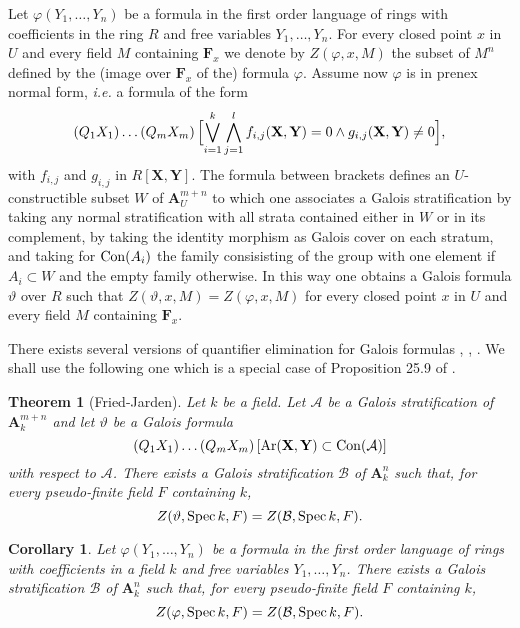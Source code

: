 \documentclass[english,12pt]{amsart}
\def\AA{{\mathbf A}}
\def\FF{{\mathbf F}}
\def\XX{{\mathbf X}}
\def\YY{{\mathbf Y}}
\def\cA{{\mathcal A}}
\def\cB{{\mathcal B}}
\newtheorem{theorem}[subsubsection]{Theorem}
\newtheorem{cor}[subsubsection]{Corollary}
\theoremstyle{definition}
\theoremstyle{remark}
\theoremstyle{plain}
\numberwithin{equation}{subsection}
\def\AA{{\mathbf A}}
\def\FF{{\mathbf F}}
\def\XX{{\mathbf X}}
\def\YY{{\mathbf Y}}
\def\cA{{\mathcal A}}
\def\cB{{\mathcal B}}
\begin{document}
Let $\varphi (Y_{1}, \ldots, Y_{n})$ be a formula 
in the first order
language of rings with coefficients in the ring $R$ and free variables
$Y_{1}, \ldots, Y_{n}$.
For every 
closed point $x$ in $U$ and every field $M$ containing
$\FF_{x}$ we denote by 
$Z (\varphi, x, M)$ the subset of 
$M^n$ defined by the (image over $\FF_{x}$ of the) formula
$\varphi$.
Assume now $\varphi$ is
in prenex normal form,
{\it i.e.} a formula of the form
\begin{equation}\label{prenex}
(Q_{1} X_{1}) \ldots (Q_{m} X_{m}) \, \Bigl[
\bigvee_{i = 1}^{k} \bigwedge_{j = 1}^l f_{i, j}
(\XX, \YY) = 0 \wedge g_{i, j}
(\XX, \YY) \not= 0
\Bigr],
\end{equation}
with $f_{i, j}$ and $g_{i, j}$ in $R [\XX, \YY]$.
The formula between brackets defines
an $U$-construct\-ible subset $W$ of $\AA_{U}^{m + n}$ to which one 
associates a Galois stratification 
by taking any normal stratification
with all strata contained either in $W$ or in its complement,
by taking the identity morphism as Galois cover on each stratum, 
and taking for ${\rm Con} (A_{i})$ the family consisisting of
the group with one element 
if
$A_{i} \subset W$ and the empty family otherwise. In this way
one obtains a Galois formula $\vartheta$ over $R$ such that
$Z (\vartheta, x, M) = Z (\varphi, x, M)$ for every closed point $x$ in
$U$ and every field $M$
containing $\FF_{x}$.


There exists 
several versions of quantifier elimination for Galois formulas
\cite{F-S}, \cite{F-H-J}, \cite{F-J}. We shall use the
following one which
is a special case
of Proposition 25.9 of \cite{F-J}.

\begin{theorem}[Fried-Jarden]\label{pfelimination}Let $k$ be a field.
Let $\cA$
be a Galois stratification of $\AA^{m + n}_{k}$ and let  $\vartheta$  
be a
Galois formula
$$
(Q_{1} X_{1}) \ldots (Q_{m} X_{m}) \, [{\rm Ar} (\XX, \YY) \subset
{\rm Con} (\cA)]
$$
with respect to $\cA$.
There exists a  Galois stratification
$\cB$ of 
$\AA^{n}_{k}$ such that,
for every pseudo-finite field $F$  containing $k$,
$$Z (\vartheta, {\rm Spec} \, k, F)
=
Z (\cB, {\rm Spec} \, k, F).
$$
\end{theorem}




\begin{cor}\label{pf2.5}Let $\varphi (Y_{1}, \ldots, Y_{n})$ be a formula 
in the first order
language of rings with coefficients in a field $k$ and free variables
$Y_{1}, \ldots, Y_{n}$.
There exists a Galois stratification
$\cB$ of 
$\AA^{n}_{k}$ such that, 
for every pseudo-finite  field $F$ containing $k$,
$$Z (\varphi, {\rm Spec} \, k, F)
=
Z (\cB, {\rm Spec} \, k, F).
$$
\end{cor}
\end{document}
